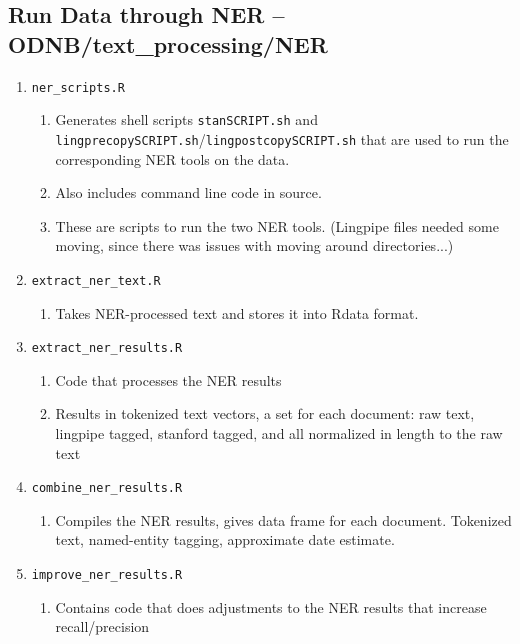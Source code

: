 \documentclass[11pt]{article}
\newcommand{\filename}[1]{\texttt{#1}}
\begin{document}
\subsection{Run Data through NER -- ODNB/text\_processing/NER}
\begin{enumerate}

\item \filename{ner\_scripts.R} 
\begin{enumerate}
\item Generates shell scripts \filename{stanSCRIPT.sh} and \filename{lingprecopySCRIPT.sh}/\filename{lingpostcopySCRIPT.sh} that are used to run the corresponding NER tools on the data. 
\item Also includes command line code in source. 
\item These are scripts to run the two NER tools. (Lingpipe files needed some moving, since there was issues with moving around directories...)
\end{enumerate}

\item \filename{extract\_ner\_text.R}
\begin{enumerate}
\item Takes NER-processed text and stores it into Rdata format. 
\end{enumerate}

\item \filename{extract\_ner\_results.R}
\begin{enumerate}
\item Code that processes the NER results
\item Results in tokenized text vectors, a set for each document: raw text, lingpipe tagged, stanford tagged, and all normalized in length to the raw text
\end{enumerate}

\item \filename{combine\_ner\_results.R}
\begin{enumerate}
\item Compiles the NER results, gives data frame for each document. Tokenized text, named-entity tagging, approximate date estimate. 
\end{enumerate}

\item \filename{improve\_ner\_results.R}
\begin{enumerate}
\item Contains code that does adjustments to the NER results that increase recall/precision
\end{enumerate}

\end{enumerate}
\end{document}
